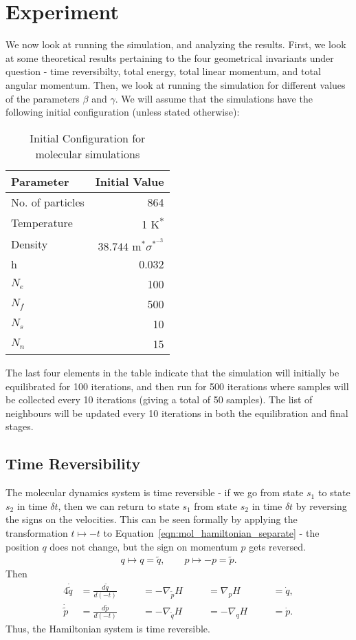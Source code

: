 \documentclass[../Main.tex]{subfiles}
\begin{document}
\section{Experiment}
We now look at running the simulation, and analyzing the results. First, we look at some theoretical results pertaining to the four geometrical invariants under question - time reversibilty, total energy, total linear momentum, and total angular momentum. Then, we look at running the simulation for different values of the parameters $\beta$ and $\gamma$.
We will assume that the simulations have the following initial configuration (unless stated otherwise):

\begin{table}[H]
	\centering
	\begin{tabular}{ |l|r| }
		\hline
		Parameter & Initial Value \\
		\hline
		No. of particles & 864 \\
		Temperature & 1 K\textsuperscript{*} \\
		Density & $38.744 \mbox{ m}^{*}\sigma^{*^{-3}}$ \\
		h & 0.032 \\
		$N_{e}$ & 100 \\
		$N_{f}$ & 500 \\
		$N_{s}$ & 10 \\
		$N_{n}$ & 15 \\
		\hline
	\end{tabular}
	\caption{Initial Configuration for molecular simulations}
	\label{tbl:initial_configuration_simulation}
\end{table}

The last four elements in the table indicate that the simulation will initially be equilibrated for 100 iterations, and then run for 500 iterations where samples will be collected every 10 iterations (giving a total of 50 samples). The list of neighbours will be updated every 10 iterations in both the equilibration and final stages.

\subsection{Time Reversibility}
The molecular dynamics system is time reversible - if we go from state $s_{1}$ to state $s_{2}$ in time $\delta t$, then we can return to state $s_{1}$ from state $s_{2}$ in time $\delta t$ by reversing the signs on the velocities. This can be seen formally by applying the transformation $t \mapsto -t$ to Equation~\ref{eqn:mol_hamiltonian_separate} - the position $q$ does not change, but the sign on momentum $p$ gets reversed.
\begin{align*}
q \mapsto q = \tilde{q},  \quad \quad p \mapsto -p = \tilde{p}.
\end{align*}
Then
\begin{alignat*}{4}
	\dot{\tilde{q}} &= \frac{d\tilde{q}}{d\left(-t\right)} \quad &&= -\nabla_{\tilde{p}}H \quad &&= \nabla_{p}H \quad &&= \dot{q},\\
	\dot{\tilde{p}} &= \frac{d\tilde{p}}{d\left(-t\right)} \quad &&= -\nabla_{\tilde{q}}H \quad && =-\nabla_{q}H \quad &&= \dot{p}.
\end{alignat*}
Thus, the Hamiltonian system is time reversible.
\end{document}
